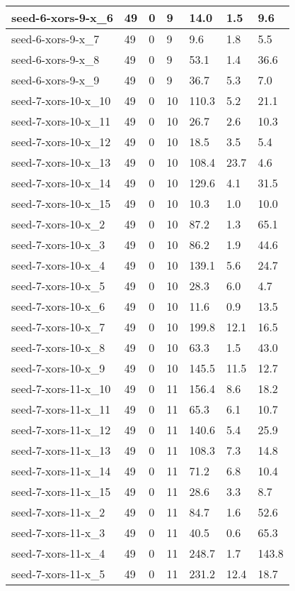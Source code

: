 \begin{scriptsize}
\begin{longtable}{|p{5cm}|l|l|l|l|l|l|}
seed-6-xors-9-x\_6&49&0&9&14.0&1.5&9.6 \\ \hline 
seed-6-xors-9-x\_7&49&0&9&9.6&1.8&5.5 \\ \hline 
seed-6-xors-9-x\_8&49&0&9&53.1&1.4&36.6 \\ \hline 
seed-6-xors-9-x\_9&49&0&9&36.7&5.3&7.0 \\ \hline 
seed-7-xors-10-x\_10&49&0&10&110.3&5.2&21.1 \\ \hline 
seed-7-xors-10-x\_11&49&0&10&26.7&2.6&10.3 \\ \hline 
seed-7-xors-10-x\_12&49&0&10&18.5&3.5&5.4 \\ \hline 
seed-7-xors-10-x\_13&49&0&10&108.4&23.7&4.6 \\ \hline 
seed-7-xors-10-x\_14&49&0&10&129.6&4.1&31.5 \\ \hline 
seed-7-xors-10-x\_15&49&0&10&10.3&1.0&10.0 \\ \hline 
seed-7-xors-10-x\_2&49&0&10&87.2&1.3&65.1 \\ \hline 
seed-7-xors-10-x\_3&49&0&10&86.2&1.9&44.6 \\ \hline 
seed-7-xors-10-x\_4&49&0&10&139.1&5.6&24.7 \\ \hline 
seed-7-xors-10-x\_5&49&0&10&28.3&6.0&4.7 \\ \hline 
seed-7-xors-10-x\_6&49&0&10&11.6&0.9&13.5 \\ \hline 
seed-7-xors-10-x\_7&49&0&10&199.8&12.1&16.5 \\ \hline 
seed-7-xors-10-x\_8&49&0&10&63.3&1.5&43.0 \\ \hline 
seed-7-xors-10-x\_9&49&0&10&145.5&11.5&12.7 \\ \hline 
seed-7-xors-11-x\_10&49&0&11&156.4&8.6&18.2 \\ \hline 
seed-7-xors-11-x\_11&49&0&11&65.3&6.1&10.7 \\ \hline 
seed-7-xors-11-x\_12&49&0&11&140.6&5.4&25.9 \\ \hline 
seed-7-xors-11-x\_13&49&0&11&108.3&7.3&14.8 \\ \hline 
seed-7-xors-11-x\_14&49&0&11&71.2&6.8&10.4 \\ \hline 
seed-7-xors-11-x\_15&49&0&11&28.6&3.3&8.7 \\ \hline 
seed-7-xors-11-x\_2&49&0&11&84.7&1.6&52.6 \\ \hline 
seed-7-xors-11-x\_3&49&0&11&40.5&0.6&65.3 \\ \hline 
seed-7-xors-11-x\_4&49&0&11&248.7&1.7&143.8 \\ \hline 
seed-7-xors-11-x\_5&49&0&11&231.2&12.4&18.7 \\ \hline 

\end{longtable}
\end{scriptsize}
